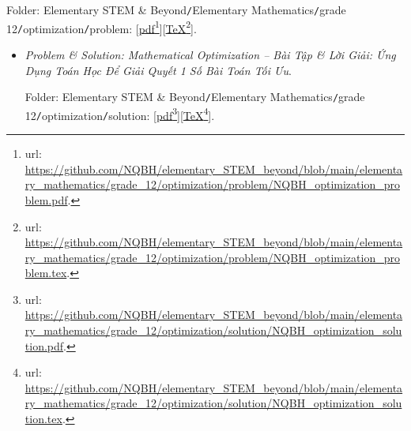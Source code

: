 \documentclass{article}
\begin{document}
\begin{itemize}
	Folder: {\sf Elementary STEM \& Beyond{\tt/}Elementary Mathematics{\tt/}grade 12{\tt/}optimization{\tt/}problem}: [\href{https://github.com/NQBH/elementary_STEM_beyond/blob/main/elementary_mathematics/grade_12/optimization/problem/NQBH_optimization_problem.pdf}{pdf}\footnote{{\sc url}: \url{https://github.com/NQBH/elementary_STEM_beyond/blob/main/elementary_mathematics/grade_12/optimization/problem/NQBH_optimization_problem.pdf}.}][\href{https://github.com/NQBH/elementary_STEM_beyond/blob/main/elementary_mathematics/grade_12/optimization/problem/NQBH_optimization_problem.tex}{\TeX}\footnote{{\sc url}: \url{https://github.com/NQBH/elementary_STEM_beyond/blob/main/elementary_mathematics/grade_12/optimization/problem/NQBH_optimization_problem.tex}.}].
	\begin{itemize}
		\item {\it Problem \& Solution: Mathematical Optimization -- Bài Tập \& Lời Giải: Ứng Dụng Toán Học Để Giải Quyết 1 Số Bài Toán Tối Ưu}.

		Folder: {\sf Elementary STEM \& Beyond{\tt/}Elementary Mathematics{\tt/}grade 12{\tt/}optimization{\tt/}solution}: [\href{https://github.com/NQBH/elementary_STEM_beyond/blob/main/elementary_mathematics/grade_12/optimization/solution/NQBH_optimization_solution.pdf}{pdf}\footnote{{\sc url}: \url{https://github.com/NQBH/elementary_STEM_beyond/blob/main/elementary_mathematics/grade_12/optimization/solution/NQBH_optimization_solution.pdf}.}][\href{https://github.com/NQBH/elementary_STEM_beyond/blob/main/elementary_mathematics/grade_12/optimization/solution/NQBH_optimization_solution.tex}{\TeX}\footnote{{\sc url}: \url{https://github.com/NQBH/elementary_STEM_beyond/blob/main/elementary_mathematics/grade_12/optimization/solution/NQBH_optimization_solution.tex}.}].
	\end{itemize}
\end{itemize}
\end{document}
